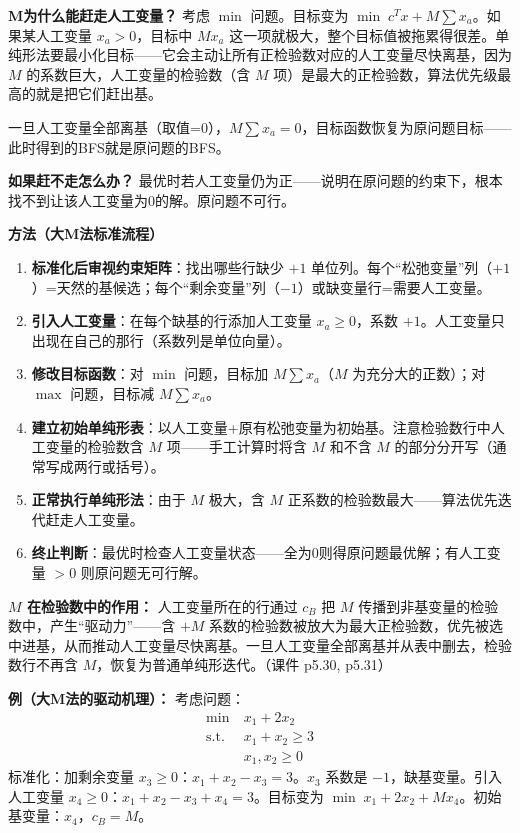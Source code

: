 \textbf{M为什么能赶走人工变量？} 考虑 $\min$ 问题。目标变为 $\min\; c^T x + M\sum x_a$。如果某人工变量 $x_a>0$，目标中 $M x_a$ 这一项就极大，整个目标值被拖累得很差。单纯形法要最小化目标——它会主动让所有正检验数对应的人工变量尽快离基，因为 $M$ 的系数巨大，人工变量的检验数（含 $M$ 项）是最大的正检验数，算法优先级最高的就是把它们赶出基。

一旦人工变量全部离基（取值=0），$M\sum x_a=0$，目标函数恢复为原问题目标——此时得到的BFS就是原问题的BFS。

\textbf{如果赶不走怎么办？} 最优时若人工变量仍为正——说明在原问题的约束下，根本找不到让该人工变量为0的解。原问题不可行。

\textbf{方法（大M法标准流程）}

\begin{enumerate}
  \item \textbf{标准化后审视约束矩阵}：找出哪些行缺少 $+1$ 单位列。每个“松弛变量”列（$+1$）=天然的基候选；每个“剩余变量”列（$-1$）或缺变量行=需要人工变量。
  \item \textbf{引入人工变量}：在每个缺基的行添加人工变量 $x_a\ge 0$，系数 $+1$。人工变量只出现在自己的那行（系数列是单位向量）。
  \item \textbf{修改目标函数}：对 $\min$ 问题，目标加 $M\sum x_a$（$M$ 为充分大的正数）；对 $\max$ 问题，目标减 $M\sum x_a$。
  \item \textbf{建立初始单纯形表}：以人工变量+原有松弛变量为初始基。注意检验数行中人工变量的检验数含 $M$ 项——手工计算时将含 $M$ 和不含 $M$ 的部分分开写（通常写成两行或括号）。
  \item \textbf{正常执行单纯形法}：由于 $M$ 极大，含 $M$ 正系数的检验数最大——算法优先迭代赶走人工变量。
  \item \textbf{终止判断}：最优时检查人工变量状态——全为0则得原问题最优解；有人工变量 $>0$ 则原问题无可行解。
\end{enumerate}

\textbf{$M$ 在检验数中的作用：} 人工变量所在的行通过 $c_B$ 把 $M$ 传播到非基变量的检验数中，产生“驱动力”——含 $+M$ 系数的检验数被放大为最大正检验数，优先被选中进基，从而推动人工变量尽快离基。一旦人工变量全部离基并从表中删去，检验数行不再含 $M$，恢复为普通单纯形迭代。（课件 p5.30, p5.31）

\textbf{例（大M法的驱动机理）：} 考虑问题：
\[
\begin{aligned}
\min\ & x_1 + 2x_2 \\
\text{s.t.}\ & x_1 + x_2 \ge 3 \\
& x_1, x_2 \ge 0
\end{aligned}
\]
标准化：加剩余变量 $x_3\ge 0$：$x_1 + x_2 - x_3 = 3$。$x_3$ 系数是 $-1$，缺基变量。引入人工变量 $x_4\ge 0$：$x_1 + x_2 - x_3 + x_4 = 3$。目标变为 $\min\; x_1+2x_2+Mx_4$。初始基变量：$x_4$，$c_B=M$。

